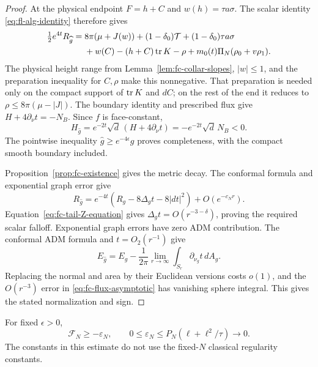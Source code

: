 \begin{proof}
At the physical endpoint $F=h+C$ and
$w(h)=\tau a\sigma$.  The scalar identity
\eqref{eq:fl-alg-identity} therefore gives
\begin{align*}
 \tfrac12e^{4t}R_{\widehat g}
 ={}&8\pi(\mu+J(w))+(1-\delta_0)\mathcal T
          +(1-\delta_0)\tau a\sigma\\
    &+w(C)-(h+C)\operatorname{tr} K-\rho
                     +m_0(t)\Pi_N(\rho_0+v\rho_1).
\end{align*}
The physical height range from
Lemma~\ref{lem:fc-collar-slopes}, $|w|\le1$, and the preparation
inequality for $C,\rho$ make this nonnegative.  That preparation
is needed only on the compact support of $\operatorname{tr} K$ and $dC$;
on the rest of the end it reduces to $\rho\le8\pi(\mu-|J|)$.
The boundary identity and prescribed flux give
$H+4\partial_\nu t=-N_B$.  Since $f$ is face-constant,
\[
 H_{\widehat g}=e^{-2t}\sqrt d\,(H+4\partial_\nu t)
                     =-e^{-2t}\sqrt d\,N_B<0.
\]
The pointwise inequality $\widehat g\ge e^{-4\epsilon}g$ proves
completeness, with the compact smooth boundary included.

Proposition~\ref{prop:fc-existence} gives the metric decay.
The conformal formula and exponential graph error give
\[
 R_{\widehat g}=e^{-4t}
       (R_g-8\Delta_g t-8|dt|^2)+O(e^{-c_Nr}).
\]
Equation~\eqref{eq:fc-tail-Z-equation} gives
$\Delta_g t=O(r^{-3-\delta})$, proving the required scalar
falloff.  Exponential graph errors have zero ADM contribution.
The conformal ADM formula and $t=O_2(r^{-1})$ give
\[
 E_{\widehat g}=E_g-\frac1{2\pi}
                     \lim_{r\to\infty}\int_{S_r}\partial_{\nu_g}t\,dA_g.
\]
Replacing the normal and area by their Euclidean versions costs
$o(1)$, and the $O(r^{-3})$ error in
\eqref{eq:fc-flux-asymptotic} has vanishing sphere integral.
This gives the stated normalization and sign.
\end{proof}

\begin{lemma}\label{lem:fc-flux-loss}
For fixed $\epsilon>0$,
\[
 \mathcal F_N\ge-\varepsilon_N,
 \qquad 0\le\varepsilon_N\le
                 P_N(\ell+\ell^2/\tau)\longrightarrow0.
\]
The constants in this estimate do not use the fixed-$N$
classical regularity constants.
\end{lemma}

